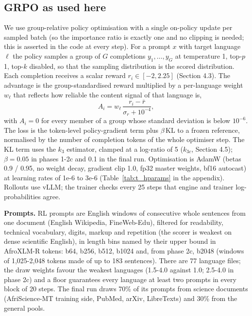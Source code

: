 \subsection{GRPO as used here}\label{grpo-as-used-here}

We use group-relative policy optimisation \citep{shao2024deepseekmath} with a single on-policy update per sampled batch (so the importance ratio is exactly one and no clipping is needed; this is asserted in the code at every step). For a prompt \(x\) with target language \(\ell\) the policy samples a group of \(G\) completions \(y_1,\dots,y_G\) at temperature 1, top-\(p\) 1, top-\(k\) disabled, so that the sampling distribution is the scored distribution. Each completion receives a scalar reward \(r_i \in [-2, 2.25]\) (Section 4.3). The advantage is the group-standardised reward multiplied by a per-language weight \(w_\ell\) that reflects how reliable the content signal of that language is, \[A_i = w_\ell \, \frac{r_i - \bar r}{\sigma_r + 10^{-4}},\] with \(A_i=0\) for every member of a group whose standard deviation is below \(10^{-6}\). The loss is the token-level policy-gradient term plus \(\beta\,\mathrm{KL}\) to a frozen reference, normalised by the number of completion tokens of the whole optimiser step. The KL term uses the \(k_3\) estimator, clamped at a log-ratio of 5 (\(k_{3c}\), Section 4.5); \(\beta=0.05\) in phases 1-2c and 0.1 in the final run. Optimisation is AdamW (betas 0.9 / 0.95, no weight decay, gradient clip 1.0, fp32 master weights, bf16 autocast) at learning rates of 1e-6 to 3e-6 (Table~\ref{tab:t_hparams} in the appendix). Rollouts use vLLM; the trainer checks every 25 steps that engine and trainer log-probabilities agree.

\textbf{Prompts.} RL prompts are English windows of consecutive whole sentences from one document (English Wikipedia, FineWeb-Edu), filtered for readability, technical vocabulary, digits, markup and repetition (the scorer is weakest on dense scientific English), in length bins named by their upper bound in AfroXLM-R tokens: b64, b256, b512, b1024 and, from phase 2c, b2048 (windows of 1,025-2,048 tokens made of up to 183 sentences). There are 77 language files; the draw weights favour the weakest languages (1.5-4.0 against 1.0; 2.5-4.0 in phase 2c) and a floor guarantees every language at least two prompts in every block of 20 steps. The final run draws 70\% of its prompts from science documents (AfriScience-MT training side, PubMed, arXiv, LibreTexts) and 30\% from the general pools.

